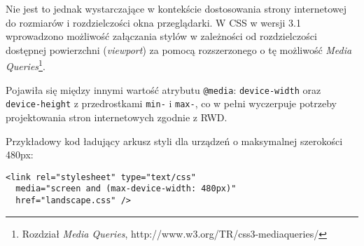 Nie jest to jednak wystarczające w kontekście dostosowania strony internetowej do rozmiarów i rozdzielczości okna przeglądarki. W CSS w wersji 3.1 wprowadzono możliwość załączania stylów w zależności od rozdzielczości dostępnej powierzchni (\emph{viewport}) za pomocą rozszerzonego o tę możliwość \emph{Media Queries}\cite{css3}\footnote{\cite{css3} Rozdział \emph{Media Queries}, http://www.w3.org/TR/css3-mediaqueries/}.

Pojawiła się między innymi wartość atrybutu \lstinline{@media}: \lstinline{device-width} oraz \lstinline{device-height} z przedrostkami \lstinline{min-} i \lstinline{max-}, co w pełni wyczerpuje potrzeby projektowania stron internetowych zgodnie z RWD.

Przykładowy kod ładujący arkusz styli dla urządzeń o maksymalnej szerokości 480px:

\lstset{language=Octave}
\begin{lstlisting}
<link rel="stylesheet" type="text/css"
  media="screen and (max-device-width: 480px)"
  href="landscape.css" />
\end{lstlisting}
